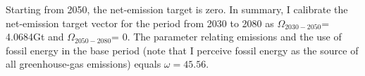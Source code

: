 Starting from 2050, the net-emission target is zero. In summary, I calibrate the net-emission target vector for the period from 2030 to 2080 as
$\Omega_{2030-2050}$= 4.0684Gt and $\Omega_{2050-2080}$= 0. The parameter relating emissions and the use of fossil energy in the base period (note that I perceive fossil energy as the source of all greenhouse-gas emissions) equals $\omega=45.56$.  

%
%
%
